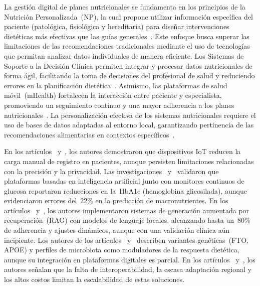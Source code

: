 \documentclass[12pt,a4paper]{article}
\begin{document}
La gestión digital de planes nutricionales se fundamenta en los principios de
la Nutrición Personalizada~(NP), la cual propone utilizar información
específica del paciente (patológica, fisiológica y hereditaria) para diseñar
intervenciones dietéticas más efectivas que las guías
generales~\cite{siddiqui2025}. Este enfoque busca superar las limitaciones de
las recomendaciones tradicionales mediante el uso de tecnologías que permitan
analizar datos individuales de manera eficiente. Los Sistemas de Soporte a la
Decisión Clínica permiten integrar y procesar datos nutricionales de forma
ágil, facilitando la toma de decisiones del profesional de salud y reduciendo
errores en la planificación dietética~\cite{quichimbo2021}. Asimismo, las
plataformas de salud móvil~(mHealth) fortalecen la interacción entre paciente
y especialista, promoviendo un seguimiento continuo y una mayor adherencia a
los planes nutricionales~\cite{ghose2021}. La personalización efectiva de los
sistemas nutricionales requiere el uso de bases de datos adaptadas al entorno
local, garantizando pertinencia de las recomendaciones alimentarias en
contextos específicos~\cite{aldarras2025}.

En los artículos~\cite{cunha2022} y~\cite{theodore2024}, los autores
demostraron que dispositivos IoT reducen la carga manual de registro en
pacientes, aunque persisten limitaciones relacionadas con la precisión y la
privacidad. Las investigaciones~\cite{lee2023} y~\cite{mortazavi2023}
validaron que plataformas basadas en inteligencia artificial junto con
monitores continuos de glucosa reportaron reducciones en la~HbA1c
(hemoglobina glicosilada), aunque evidenciaron errores del~22\% en la
predicción de macronutrientes. En los artículos~\cite{gavai2025}
y~\cite{arshad2025}, los autores implementaron sistemas de generación
aumentada por recuperación~(RAG) con modelos de lenguaje locales, alcanzando
hasta un~80\% de adherencia y ajustes dinámicos, aunque con una validación
clínica aún incipiente. Los autores de los artículos~\cite{singar2024}
y~\cite{xu2025} describen variantes genéticas~(FTO, APOE) y perfiles de
microbiota como moduladores de la respuesta dietética, aunque su integración
en plataformas digitales es parcial. En los artículos~\cite{abeltino2025}
y~\cite{ebadi2025}, los autores señalan que la falta de interoperabilidad, la
escasa adaptación regional y los altos costos limitan la escalabilidad de
estas soluciones.
\end{document}
